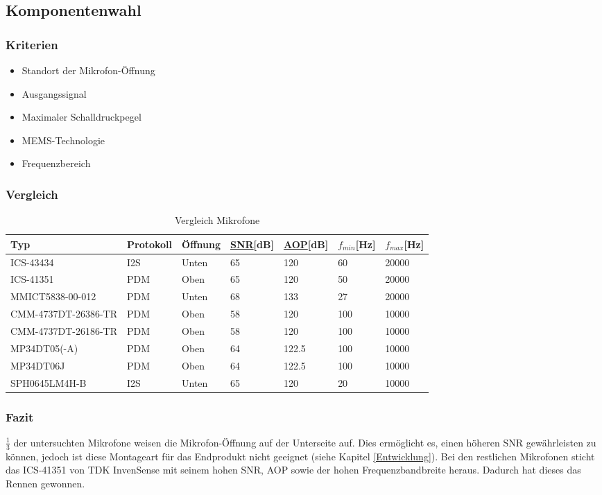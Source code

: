 \documentclass[12pt]{article}
\begin{document}
	\subsection{Komponentenwahl}
	\subsubsection{Kriterien}
	\begin{itemize}
		\item Standort der Mikrofon-Öffnung
		\item Ausgangssignal
		\item Maximaler Schalldruckpegel
		\item MEMS-Technologie
		\item Frequenzbereich
	\end{itemize}
	\subsubsection{Vergleich}
	\begin{table}[H]
		\centering
		\begin{tabular}{|p{}|l|l|l|l|l|l|}
			\hline
			\textbf{Typ} & \textbf{Protokoll} & \textbf{Öffnung} & \textbf{\hyperref[SNR]{SNR}[dB]} & \textbf{\hyperref[AOP]{AOP}[dB]} & \textbf{$f_{min}$[Hz]} & \textbf{$f_{max}$[Hz]} \\\hline
	ICS-43434 & I2S & Unten & 65 & 120 & 60 & 20000 \\ \hline
	ICS-41351 & PDM & Oben & 65 & 120 & 50 & 20000 \\ \hline
	MMICT5838-00-012 & PDM & Unten & 68 & 133 & 27 & 20000 \\ \hline
	CMM-4737DT-26386-TR & PDM & Oben & 58 & 120 & 100 & 10000 \\ \hline
	CMM-4737DT-26186-TR & PDM & Oben & 58 & 120 & 100 & 10000 \\ \hline
	MP34DT05(-A) & PDM & Oben & 64 & 122.5 & 100 & 10000 \\ \hline
	MP34DT06J & PDM & Oben & 64 & 122.5 & 100 & 10000 \\ \hline
	SPH0645LM4H-B & I2S & Unten & 65 & 120 & 20 & 10000 \\ \hline
	\end{tabular}
	\caption{Vergleich Mikrofone}
	\label{table:vergleich-mikrofone}
\end{table}

	\subsubsection{Fazit}
	$\frac{1}{3}$ der untersuchten Mikrofone weisen die Mikrofon-Öffnung auf der Unterseite auf. Dies ermöglicht es, einen höheren SNR gewährleisten zu können, jedoch ist diese Montageart für das Endprodukt nicht geeignet (siehe Kapitel \ref{Entwicklung}). Bei den restlichen Mikrofonen sticht das ICS-41351 von TDK InvenSense mit seinem hohen SNR, AOP sowie der hohen Frequenzbandbreite heraus. Dadurch hat dieses das Rennen gewonnen.
	\newpage
\end{document}

